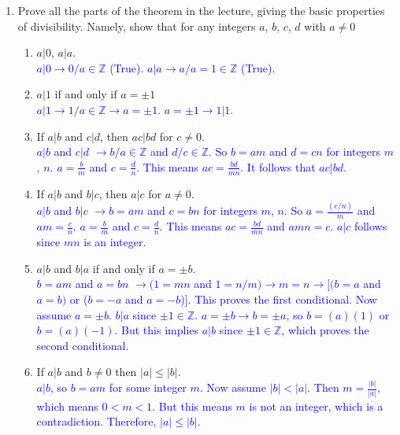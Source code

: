 \documentclass[13.5pt]{article}
\begin{document}
\begin{enumerate}
\item{Prove all the parts of the theorem in the lecture, giving the basic properties of divisibility. Namely, show that for any integers \(a\), \(b\), \(c\), \(d\) with \(a \neq 0\)}   

\begin{enumerate}
\setlength{\itemindent}{.1in}
\item{\(a|0\), \(a|a\).}\\
\textcolor{blue} {\(a|0 \rightarrow 0/a \in  \mathbb{Z}\) (True). \(a|a \rightarrow a/a=1 \in  \mathbb{Z}\) (True). }
\item{\(a|1\) if and only if \(a=\pm 1\)}\\
\textcolor{blue} {\(a|1 \rightarrow 1/a \in  \mathbb{Z} \rightarrow a=\pm 1\). \(a=\pm 1 \rightarrow 1|1\). }

\item{If \(a|b\) and \(c|d\), then \(ac|bd\) for \(c \neq 0\).}\\
\textcolor{blue} {\(a|b\) and \(c|d\) \(\rightarrow b/a \in  \mathbb{Z}\) and \(d/c \in  \mathbb{Z}\). So \(b=am\) and \(d=cn\) for integers \(m\), \(n\). \(a=\frac{b}{m}\) and \(c=\frac{d}{n}\). This means \(ac=\frac{bd}{mn}\). It follows that \(ac|bd\).}

\item{If \(a|b\) and \(b|c\), then \(a|c\) for \(a \neq 0\).}\\
\textcolor{blue} {\(a|b\) and \(b|c\) \(\rightarrow b=am\) and \(c=bn\) for integers \(m\), \(n\). So \(a=\frac{(c/n)}{m}\) and \(am=\frac{c}{n}\). \(a=\frac{b}{m}\) and \(c=\frac{d}{n}\). This means \(ac=\frac{bd}{mn}\) and \(amn=c\). \(a|c\) follows since \(mn\) is an integer.}

\item{\(a|b\) and \(b|a\) if and only if \(a=\pm b\).}\\
\textcolor{blue} {\(b=am\) and \(a=bn\) \(\rightarrow (1=mn\) and \(1=n/m) \rightarrow m=n \rightarrow [(b=a\) and \(a=b)\) or (\(b=-a\) and \(a=-b\))]. This proves the first conditional. }
\textcolor{blue} {Now assume \(a=\pm b\). \(b|a\) since \(\pm 1 \in  \mathbb{Z}\). \(a=\pm b \rightarrow b=\pm a\), so \(b=(a)(1)\) or \(b=(a)(-1)\). But this implies \(a|b\) since \(\pm 1 \in  \mathbb{Z}\), which proves the second conditional. }


\item{If \(a|b\) and \(b \neq 0\) then \(|a|\leq|b|\).}\\
\textcolor{blue} {\(a|b\), so \(b=am\) for some integer \(m\). Now assume \(|b| < |a|\). Then \(m=\frac{|b|}{|a|}\), which means \(0<m<1\). But this means \(m\) is not an integer, which is a contradiction. Therefore, \(|a|\leq|b|\).}



\end{enumerate}
\end{enumerate}
\end{document}
